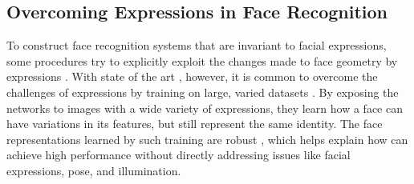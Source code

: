 \subsection{Overcoming Expressions in Face Recognition}

To construct face recognition systems that are invariant to facial expressions, some procedures try to explicitly exploit the changes made to face geometry by expressions \cite{exp-inv-1, exp-inv-2, exp-inv-3}. With state of the art , however, it is common to overcome the challenges of expressions by training on large, varied datasets \cite{facenet, deepface, deepid3}. By exposing the networks to images with a wide variety of expressions, they learn how a face can have variations in its features, but still represent the same identity. The face representations learned by such training are robust \cite{robust}, which helps explain how  can achieve high performance without directly addressing issues like facial expressions, pose, and illumination.

\cleardoublepage